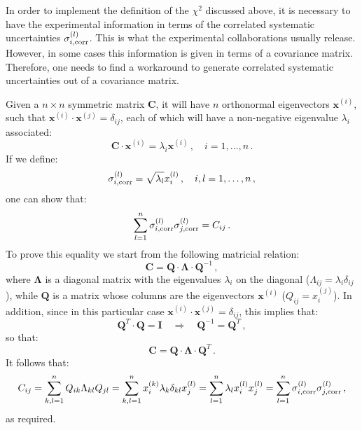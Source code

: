 \documentclass[10pt,a4paper]{article}
\begin{document}
In order to implement the definition of the $\chi^2$ discussed above,
it is necessary to have the experimental information in terms of the
correlated systematic uncertainties $\sigma_{i,\rm corr}^{(l)}$. This
is what the experimental collaborations usually release. However, in
some cases this information is given in terms of a covariance
matrix. Therefore, one needs to find a workaround to generate
correlated systematic uncertainties out of a covariance matrix. 

Given a $n \times n$ symmetric matrix $\mathbf{C}$, it will have $n$
orthonormal eigenvectors $\mathbf{x}^{(i)}$, such that
$\mathbf{x}^{(i)}\cdot \mathbf{x}^{(j)}=\delta_{ij}$, each of which
will have a non-negative eigenvalue $\lambda_i$ associated:
\begin{equation}
  \mathbf{C}\cdot \mathbf{x}^{(i)} = \lambda_i \mathbf{x}^{(i)}\,, \quad
  i =1,\dots,n\,.
\end{equation}
If we define:
\begin{equation}\label{eq:artsys}
  \sigma_{i,\rm corr}^{(l)} = \sqrt{\lambda_l} x_i^{(l)}\,,\quad i,l=1,\dots,n\,,
\end{equation}
one can show that:
\begin{equation}\label{eq:artsydef}
  \sum_{l=1}^{n}\sigma_{i,\rm corr}^{(l)}\sigma_{j,\rm corr}^{(l)} =C_{ij}\,.
\end{equation}
To prove this equality we start from the following matricial relation:
\begin{equation}
\mathbf{C} =\mathbf{Q}\cdot \mathbf{\Lambda}\cdot \mathbf{Q}^{-1}\,,
\end{equation}
where $\mathbf{\Lambda}$ is a diagonal matrix with the eigenvalues
$\lambda_i$ on the diagonal ($\Lambda_{ij} = \lambda_i\delta_{ij}$),
while $\mathbf{Q}$ is a matrix whose columns are the eigenvectors
$\mathbf{x}^{(i)}$ ($Q_{ij} = x_{i}^{(j)}$). In addition, since in
this particular case
$\mathbf{x}^{(i)}\cdot \mathbf{x}^{(j)}=\delta_{ij}$, this implies
that:
\begin{equation}
\mathbf{Q}^T \cdot \mathbf{Q}  = \mathbf{I}\quad\Rightarrow\quad
\mathbf{Q}^{-1} =  \mathbf{Q}^{T}\,,
\end{equation}
so that:
\begin{equation}\label{eq:diagC}
  \mathbf{C} =\mathbf{Q}\cdot \mathbf{\Lambda}\cdot \mathbf{Q}^{T}\,.
\end{equation}
It follows that:
\begin{equation}
  C_{ij} =\sum_{k,l=1}^{n}Q_{ik}\Lambda_{kl} Q_{jl} = \sum_{k,l=1}^{n} x_{i}^{(k)}
  \lambda_{k}\delta_{kl}x_{j}^{(l)} = \sum_{l=1}^{n} \lambda_{l}x_{i}^{(l)}
  x_{j}^{(l)}=\sum_{l=1}^{n}\sigma_{i,\rm corr}^{(l)}\sigma_{j,\rm corr}^{(l)} \,,
\end{equation}
as required.
\end{document}
